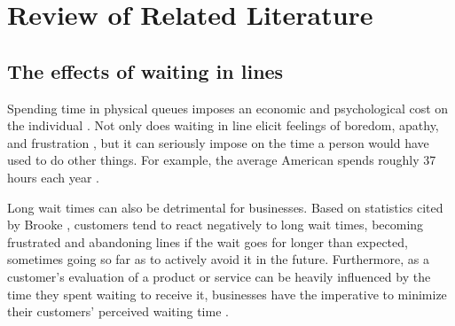\chapter{Review of Related Literature}
\label{sec:relatedlit}

\begin{comment}
%
%
Guide on Writing your RRL chapter
 
1. Identify the keywords with respect to your research
      One keyword = One document section
                Examples: 2.1 Story Generation Systems
			 2.2 Knowledge Representation

2.  Find references using these keywords

3.  For each of the references that you find,
        Check: Is it relevant to your research?
        Use their references to find more relevant works.

4. Identify a set of criteria for comparison.
       It will serve as a guide to help you focus on what to look for

5. Write a summary focusing on -
       What: A short description of the work
       How: A summary of the approach it utilized
       Findings: If applicable, provide the results
        Why: Relevance to your work

6. At the end of each section,  show a Table of Comparison of the related works 
   and your proposed project/system

\end{comment}

\section{The effects of waiting in lines}

Spending time in physical queues imposes an economic and psychological cost on the individual \cite{chebat1993impact}. Not only does waiting in line elicit feelings of boredom, apathy, and frustration \cite{waitwhile2022survey}, but it can seriously impose on the time a person would have used to do other things. For example, the average American spends roughly 37 hours each year \cite{stone2012waiting}. 

Long wait times can also be detrimental for businesses. Based on statistics cited by Brooke \citeyear{brooke2013ditch}, customers tend to react negatively to long wait times, becoming frustrated and abandoning lines if the wait goes for longer than expected, sometimes going so far as to actively avoid it in the future. Furthermore, as a customer’s evaluation of a product or service can be heavily influenced by the time they spent waiting to receive it, businesses have the imperative to minimize their customers’ perceived waiting time \cite{chebat1993impact}. 

